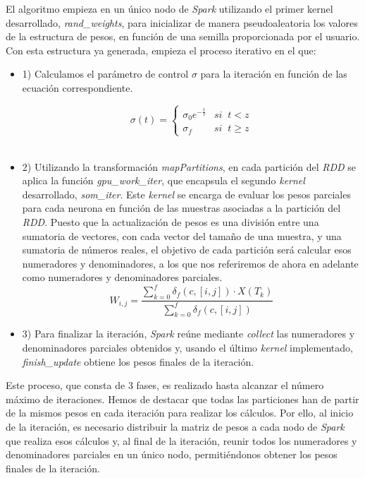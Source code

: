 El algoritmo empieza en un único nodo de \textit{Spark} utilizando el primer kernel desarrollado, \textit{rand\_weights}, para inicializar de manera pseudoaleatoria los valores de la estructura de pesos, en función de una semilla proporcionada por el usuario. Con esta estructura ya generada, empieza el proceso iterativo en el que:
\begin{itemize}
    \item 1) Calculamos el parámetro de control $\sigma$ para la iteración en función de las ecuación correspondiente.

$$\sigma(t) = \left\{
\begin{array}{ll}
\sigma_0e^{-\frac{t}{\tau}} & si \;\;t < z\\
\sigma_f & si  \;\; t\geq z
\end{array}
\right.
$$\\
    \item 2) Utilizando la transformación \textit{mapPartitions}, en cada partición del \textit{RDD} se aplica la función \textit{gpu\_work\_iter}, que encapsula el segundo  \textit{kernel} desarrollado, \textit{som\_iter}. Este \textit{kernel} se encarga de evaluar los pesos parciales para cada neurona en función de las muestras asociadas a la partición del \textit{RDD}. Puesto que la actualización de pesos es una división entre una sumatoria de vectores, con cada vector del tamaño de una muestra, y una sumatoria de números reales, el objetivo de cada partición será calcular esos numeradores y denominadores, a los que nos referiremos de ahora en adelante como numeradores y denominadores parciales.
    $$
 W_{i, j} = \frac{\sum_{k=0}^{f} \delta_f(c, [i,j]) \cdot  X(T_k) }{\sum_{k=0}^{f} \delta_f(c, [i,j])}
$$
    \item 3) Para finalizar la iteración, \textit{Spark} reúne mediante \textit{collect} las numeradores y denominadores parciales obtenidos y, usando el último \textit{kernel} implementado, \textit{finish\_update} obtiene los pesos finales de la iteración.\\
\end{itemize}

Este proceso, que consta de 3 fases, es realizado hasta alcanzar el número máximo de iteraciones. Hemos de destacar que todas las particiones han de partir de la mismos pesos en cada iteración para realizar los cálculos. Por ello, al inicio de la iteración, es necesario distribuir la matriz de pesos a cada nodo de \textit{Spark} que realiza esos cálculos y, al final de la iteración, reunir todos los numeradores y denominadores parciales en un único nodo, permitiéndonos obtener los pesos finales de la iteración. \\

